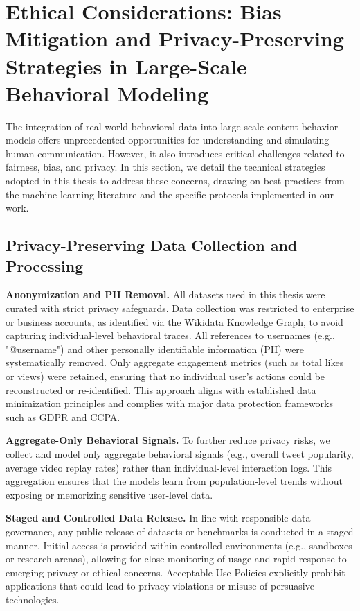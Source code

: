 \section{Ethical Considerations: Bias Mitigation and Privacy-Preserving Strategies in Large-Scale Behavioral Modeling}
\label{sec:bias-privacy-appendix}
The integration of real-world behavioral data into large-scale content-behavior models offers unprecedented opportunities for understanding and simulating human communication. However, it also introduces critical challenges related to fairness, bias, and privacy. In this section, we detail the technical strategies adopted in this thesis to address these concerns, drawing on best practices from the machine learning literature and the specific protocols implemented in our work.

\subsection{Privacy-Preserving Data Collection and Processing}

\textbf{Anonymization and PII Removal.}
All datasets used in this thesis were curated with strict privacy safeguards. Data collection was restricted to enterprise or business accounts, as identified via the Wikidata Knowledge Graph, to avoid capturing individual-level behavioral traces. All references to usernames (e.g., "@username") and other personally identifiable information (PII) were systematically removed. Only aggregate engagement metrics (such as total likes or views) were retained, ensuring that no individual user’s actions could be reconstructed or re-identified. This approach aligns with established data minimization principles and complies with major data protection frameworks such as GDPR and CCPA.

\textbf{Aggregate-Only Behavioral Signals.}
To further reduce privacy risks, we collect and model only aggregate behavioral signals (e.g., overall tweet popularity, average video replay rates) rather than individual-level interaction logs. This aggregation ensures that the models learn from population-level trends without exposing or memorizing sensitive user-level data.


\textbf{Staged and Controlled Data Release.}
In line with responsible data governance, any public release of datasets or benchmarks is conducted in a staged manner. Initial access is provided within controlled environments (e.g., sandboxes or research arenas), allowing for close monitoring of usage and rapid response to emerging privacy or ethical concerns. Acceptable Use Policies explicitly prohibit applications that could lead to privacy violations or misuse of persuasive technologies.


